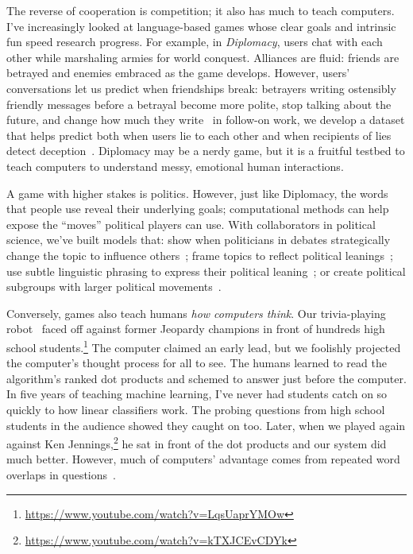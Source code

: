 \documentclass[11pt]{amsart}
\begin{document}
The reverse of cooperation is competition; it also has much to teach computers.
I've increasingly looked at language-based games whose clear goals and
intrinsic fun speed research progress. For example, in \emph{Diplomacy}, users
chat with each other while marshaling armies for world conquest. Alliances are
fluid: friends are betrayed and enemies embraced as the game develops. However,
users' conversations let us predict when friendships break: betrayers writing
ostensibly friendly messages before a betrayal become more polite, stop talking
about the future, and change how much they write~\cite{niculae-15} in follow-on
work, we develop a dataset that helps predict both when users lie to each other
and when recipients of lies detect deception~\cite{Peskov-20}. Diplomacy may be
a nerdy game, but it is a fruitful testbed to teach computers to understand
messy, emotional human interactions.

A game with higher stakes is politics. However, just like Diplomacy, the words
that people use reveal their underlying goals; computational methods can help
expose the ``moves'' political players can use. With collaborators in political
science, we've built models that: show when politicians in debates
strategically change the topic to influence others~\cite{nguyen-12,Nguyen-14b};
frame topics to reflect political leanings~\cite{nguyen-13:shlda}; use subtle
linguistic phrasing to express their political leaning~\cite{iyyer-14a}; or
create political subgroups with larger political
movements~\cite{Nguyen:Boyd-Graber:Resnik:Miler-2015}.

Conversely, games also teach humans \emph{how computers think}.  Our
trivia-playing robot~\cite{boyd-graber-12,iyyer-14b,iyyer-15} faced off against
former Jeopardy champions in front of hundreds high school
students.\footnote{\url{https://www.youtube.com/watch?v=LqsUaprYMOw}} The
computer claimed an early lead, but we foolishly projected the computer's
thought process for all to see.  The humans learned to read the algorithm's
ranked dot products and schemed to answer just before the computer. In five
years of teaching machine learning, I've never had students catch on so quickly
to how linear classifiers work.  The probing questions from high school students
in the audience showed they caught on too.  Later, when we played again against
Ken Jennings,\footnote{\url{https://www.youtube.com/watch?v=kTXJCEvCDYk}} he sat
in front of the dot products and our system did much better.  However,
much of computers' advantage comes from repeated word overlaps in
questions~\cite{wallace-19}.
\end{document}

